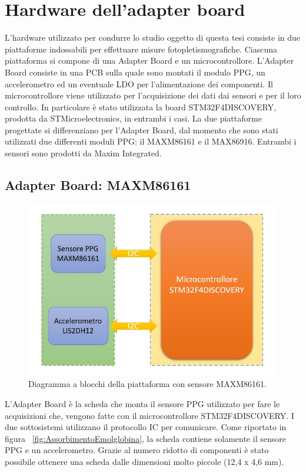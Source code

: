 \section{Hardware dell'adapter board}
L'hardware utilizzato per condurre lo studio oggetto di questa tesi consiste in due piattaforme indossabili per effettuare misure fotopletismografiche. Ciascuna piattaforma si compone di una Adapter Board e un microcontrollore. L'Adapter Board consiste in una PCB sulla quale sono montati il modulo PPG, un accelerometro ed un eventuale LDO per l'alimentazione dei componenti. Il microcontrollore viene utilizzato per l'acquisizione dei dati dai sensori e per il loro controllo. In particolare è stato utilizzata la board STM32F4DISCOVERY, prodotta da STMicroelectronics, in entrambi i casi.
La due piattaforme progettate si differenziano per l'Adapter Board, dal momento che sono stati utilizzati due differenti moduli PPG: il MAXM86161 e il MAX86916. Entrambi i sensori sono prodotti da Maxim Integrated.
\subsection{Adapter Board: MAXM86161}
\begin{figure}[h]
	\centering
	\includegraphics[width=0.8\linewidth]{ImageFiles/Hardware/diagramma_blocchi_MAXM}
	\caption{Diagramma a blocchi della piattaforma con sensore MAXM86161.}
	\label{fig:diagramma_blocchi_MAXM}
\end{figure} 
L'Adapter Board è la scheda che monta il sensore PPG utilizzato per fare le acquisizioni che, vengono fatte con il microcontrollore STM32F4DISCOVERY. I due sottosistemi utilizzano il protocollo IC per comunicare. Come riportato in figura \Fig~\ref{fig:AssorbimentoEmolglobina}, la scheda contiene solamente il sensore PPG e un accelerometro. Grazie al numero ridotto di componenti è stato possibile ottenere una scheda dalle dimensioni molto piccole (12,4 x 4,6 mm).

